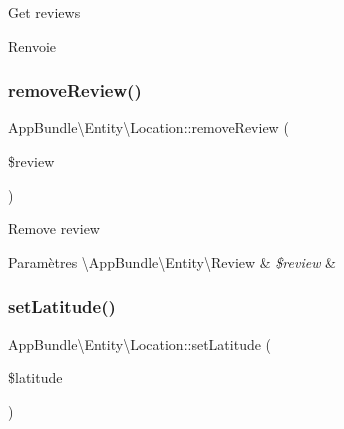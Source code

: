 Get reviews

\begin{DoxyReturn}{Renvoie}

\end{DoxyReturn}
\mbox{\label{classAppBundle_1_1Entity_1_1Location_a42339fbc46751d310a10c650b8b4d797}} 
\subsubsection{\texorpdfstring{remove\+Review()}{removeReview()}}
{\footnotesize\ttfamily App\+Bundle\textbackslash{}\+Entity\textbackslash{}\+Location\+::remove\+Review (\begin{DoxyParamCaption}\item[{\textbackslash{}\hyperlink{classAppBundle_1_1Entity_1_1Review}{App\+Bundle\textbackslash{}\+Entity\textbackslash{}\+Review}}]{\$review }\end{DoxyParamCaption})}

Remove review


\begin{DoxyParams}[1]{Paramètres}
\textbackslash{}\+App\+Bundle\textbackslash{}\+Entity\textbackslash{}\+Review & {\em \$review} & \\
\hline
\end{DoxyParams}
\mbox{\label{classAppBundle_1_1Entity_1_1Location_aec02b0397a895b43863dc95118eca59d}} 
\subsubsection{\texorpdfstring{set\+Latitude()}{setLatitude()}}
{\footnotesize\ttfamily App\+Bundle\textbackslash{}\+Entity\textbackslash{}\+Location\+::set\+Latitude (\begin{DoxyParamCaption}\item[{}]{\$latitude }\end{DoxyParamCaption})}


